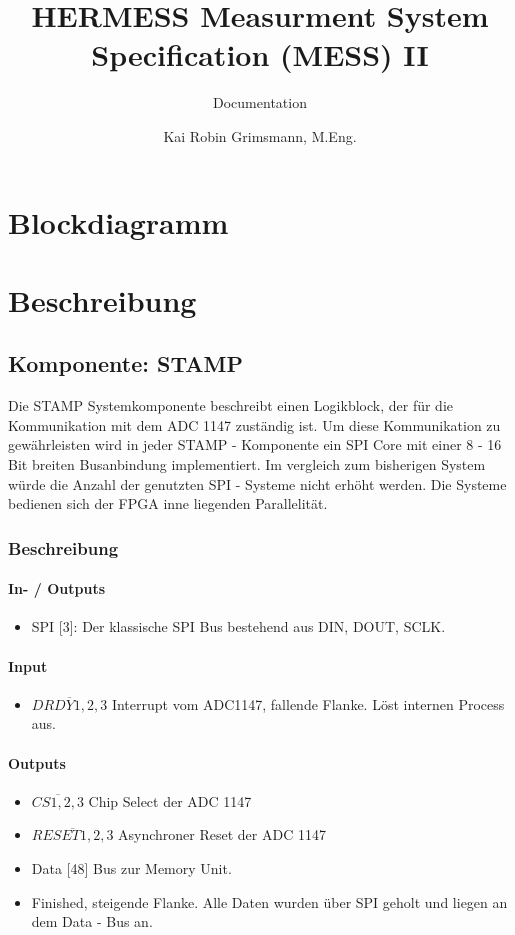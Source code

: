 \documentclass{scrreprt}
\title{HERMESS Measurment System Specification (MESS) II }
\subtitle{Documentation}
\author{Kai Robin Grimsmann, M.Eng.}
\begin{document}

\thispagestyle{empty}
\tableofcontents 
\pagebreak
\chapter{Blockdiagramm}


\chapter{Beschreibung}
\section{Komponente: STAMP}
Die STAMP Systemkomponente beschreibt einen Logikblock, der für die Kommunikation mit dem ADC 1147 zuständig ist. Um diese Kommunikation zu gewährleisten wird in jeder STAMP - Komponente ein SPI Core mit einer 8 - 16 Bit breiten  Busanbindung implementiert. Im vergleich zum bisherigen System würde die Anzahl der genutzten SPI - Systeme nicht erhöht werden. Die Systeme bedienen sich der FPGA inne liegenden Parallelität. 
\subsection{Beschreibung} 
\subsubsection{In- / Outputs}
\begin{itemize}
\item SPI [3]: Der klassische SPI Bus bestehend aus DIN, DOUT, SCLK.
\end{itemize}
\subsubsection{Input}
\begin{itemize}
\item $\overline{DRDY1,2,3}$ Interrupt vom ADC1147, fallende Flanke. Löst internen Process aus.  
\end{itemize}
\subsubsection{Outputs}
\begin{itemize}
\item $\overline{CS1,2,3} $ Chip Select der ADC 1147
\item $\overline{RESET1,2,3}$ Asynchroner Reset der ADC 1147
\item Data [48] Bus zur Memory Unit. 
\item Finished, steigende Flanke. Alle Daten wurden über SPI geholt und liegen an dem Data - Bus an. 
\end{itemize}
\end{document}
